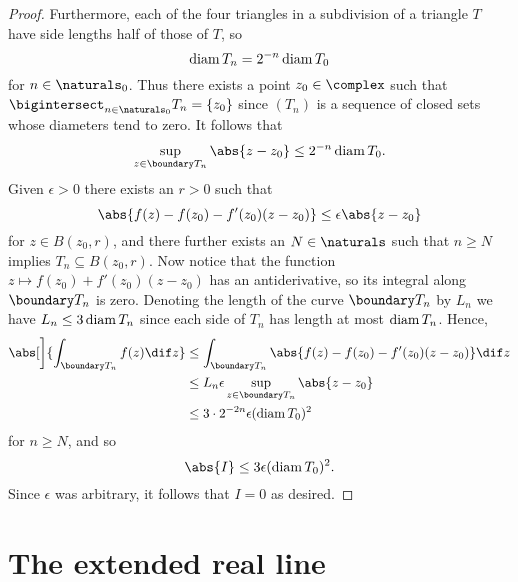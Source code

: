 \documentclass[article, a4paper, 11pt, oneside]{memoir}
\numberwithin{equation}{chapter}
\begin{document}
\begin{proof}
    Furthermore, each of the four triangles in a subdivision of a triangle $T$ have side lengths half of those of $T$, so
    \begin{equation*}
        \operatorname{diam} T_n
            = 2^{-n} \operatorname{diam} T_0
    \end{equation*}
    for $n \in \naturals_0$. Thus there exists a point $z_0 \in \complex$ such that $\bigintersect_{n\in\naturals_0} T_n = \{ z_0 \}$ since $(T_n)$ is a sequence of closed sets whose diameters tend to zero. It follows that
    \begin{equation*}
        \sup_{z \in \boundary T_n} \abs{z - z_0}
            \leq 2^{-n} \diam T_0.
    \end{equation*}
    Given $\epsilon > 0$ there exists an $r > 0$ such that
    \begin{equation*}
        \abs{ f(z) - f(z_0) - f'(z_0)(z - z_0) }
            \leq \epsilon \abs{z - z_0}
    \end{equation*}
    for $z \in B(z_0,r)$, and there further exists an $N \in \naturals$ such that $n \geq N$ implies $T_n \subseteq B(z_0,r)$. Now notice that the function $z \mapsto f(z_0) + f'(z_0)(z - z_0)$ has an antiderivative, so its integral along $\boundary T_n$ is zero. Denoting the length of the curve $\boundary T_n$ by $L_n$ we have $L_n \leq 3 \operatorname{diam} T_n$ since each side of $T_n$ has length at most $\operatorname{diam} T_n$. Hence,
    \begin{align*}
        \abs[\bigg]{ \int_{\boundary T_n} f(z) \dif z }
            &\leq \int_{\boundary T_n} \abs{ f(z) - f(z_0) - f'(z_0)(z - z_0) } \dif z \\
            &\leq L_n \epsilon \sup_{z \in \boundary T_n} \abs{z - z_0} \\
            &\leq 3 \cdot 2^{-2n} \epsilon (\diam T_0)^2
    \end{align*}
    for $n \geq N$, and so
    \begin{equation*}
        \abs{I}
            \leq 3 \epsilon (\diam T_0)^2.
    \end{equation*}
    Since $\epsilon$ was arbitrary, it follows that $I = 0$ as desired.
\end{proof}


\chapter{The extended real line}
\end{document}
